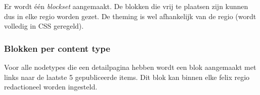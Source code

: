 Er wordt \'{e}\'{e}n \emph{blockset} aangemaakt. De blokken die vrij te plaatsen zijn kunnen dus in elke regio worden gezet. De theming is wel afhankelijk van de regio (wordt volledig in CSS geregeld).

\subsubsection{Blokken per content type}\label{felixcontenttypeblokken}

Voor alle nodetypes die een detailpagina hebben wordt een blok aangemaakt met links naar de laatste 5 gepubliceerde items. Dit blok kan binnen elke felix regio redactioneel worden ingesteld.

